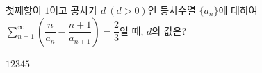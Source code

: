 첫째항이 $1$이고 공차가 $d\ (d>0)$인 등차수열 $\{a_n\}$에 대하여 $\displaystyle\sum_{n=1}^{\infty}\left(\dfrac{n}{a_n}-\dfrac{n+1}{a_{n+1}}\right)=\dfrac{2}{3}$일 때, $d$의 값은?
\begin{choices32}{$1$}{$2$}{$3$}{$4$}{$5$}\end{choices32}

